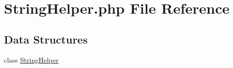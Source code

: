 \hypertarget{_string_helper_8php}{}\section{String\+Helper.\+php File Reference}
\label{_string_helper_8php}
\subsection*{Data Structures}
\begin{DoxyCompactItemize}
\item 
class \hyperlink{class_string_helper}{String\+Helper}
\end{DoxyCompactItemize}
